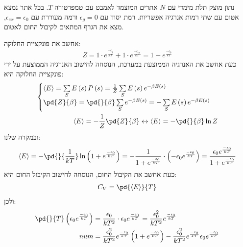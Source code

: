 \documentclass{article}
\begin{document}
\begin{Question}
נתון מוצק תלת מימדי עם $N$ אתרים המוצמד לאמבט עם טמפרטורה $T$. בכל אתר נמצא אטום עם שתי רמות אנרגיה אפשריות. רמת יסוד עם $\epsilon_{g}=0$ ורמה מעוררת עם $\epsilon_{ex}=\epsilon_{0}$, מצא את הגרף המתאים לקיבול החום לאטום.
\end{Question}
\begin{Answer}
אחשב את פונקציית החלוקה:
\begin{align*}
    Z=1\cdot e^{\frac{-\epsilon_{g}}{kT}}+1\cdot e^{\frac{-\epsilon_{ex}}{kT}}=1+e^{\frac{-\epsilon_{0}}{kT}}
\end{align*}
כעת אחשב את האנרגיה הממוצעת במערכת, הנוסחה לחישוב האנרגיה הממוצעת על ידי פונקציית החלוקה היא:
\begin{align}\label{אנרגיה ממוצעת}
    \begin{cases}
        \langle E \rangle=\sum \limits^{}_{S}{E\left( s \right)P\left( s \right)}=\frac{1}{Z}\sum \limits^{}_{S}{E\left( s \right)e^{-\beta E\left( s \right)}}\\
        \pd{Z}{\beta}=\pd{}{\beta}\sum \limits^{}_{S}{e^{-\beta E\left( s \right)}}=-\sum \limits^{}_{S}{E\left( s \right)e^{-\beta E\left( s \right)}}
    \end{cases}\\
    \langle E \rangle=-\frac{1}{Z}\pd{Z}{\beta}\leftrightarrow\langle E \rangle=-\pd{}{\beta}\ln{Z}
\end{align}
ובמקרה שלנו:
\begin{align*}
    \langle E \rangle=-\pd{}{\frac{1}{kT}}\ln{\left( 1+e^{\frac{-\epsilon_{0}}{kT}} \right)}=-\frac{1}{1+e^{\frac{-\epsilon_{0}}{kT}}}\cdot \left( -\epsilon_{0}e^{\frac{-\epsilon_{0}}{kT}} \right)=\frac{\epsilon_{0}e^{\frac{-\epsilon_{0}}{kT}}}{1+e^{\frac{-\epsilon_{0}}{kT}}}
\end{align*}
כעת אחשב את הקיבול החום, הנוסחה לחישוב הקיבול החום היא:
\begin{align}\label{קיבול החום}
    C_{V}=\pd{\langle E \rangle}{T}
\end{align}
ולכן:
\begin{align*}
    \pd{}{T}\left( \epsilon_{0}e^{\frac{-\epsilon_{0}}{kT}} \right)&=\frac{\epsilon_{0}}{kT^{2}}\cdot\epsilon_{0}e^{\frac{-\epsilon_{0} }{kT}}=\frac{\epsilon_{0}^{2}}{kT^{2}}e^{\frac{-\epsilon_{0}}{kT}}\\
    num &= \frac{\epsilon_{0}^{2}}{kT^{2}}e^{\frac{-\epsilon_{0}}{kT}}\left( 1+e^{\frac{-\epsilon_{0}}{kT}} \right) - \frac{\epsilon_{0}^{2}}{kT^{2}}e^{\frac{-\epsilon_{0}}{kT}}\epsilon_{0}e^{\frac{-\epsilon_{0}}{kT}}\\

\end{align*}
\end{Answer}
\end{document}
